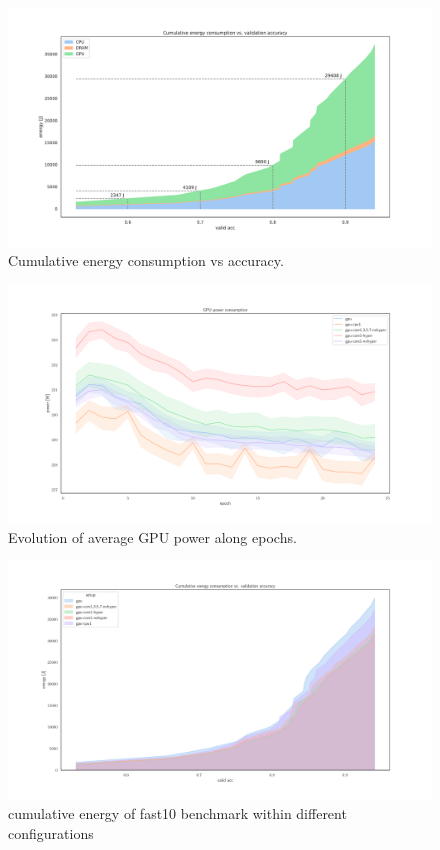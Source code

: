 \begin{figure}
    \centering
    \includegraphics[width=\linewidth]{imgs/cumulative_energy_vs_accuracy}
    \caption{Cumulative energy consumption vs accuracy.}
    \label{fig:cum_energy_vs_accuracy}
\end{figure}
\begin{figure}
    \centering
    \includegraphics[width=\linewidth]{imgs/power_gpu_baedonepoche}
    \caption{Evolution of average GPU power along epochs.}
    \label{fig:p2}
\end{figure}
\begin{figure}
    \centering
    \includegraphics[width=\linewidth]{imgs/cumulative_energy_fast10}
    \caption{cumulative energy of fast10 benchmark within different configurations }
    \label{fig:p2}
\end{figure}

